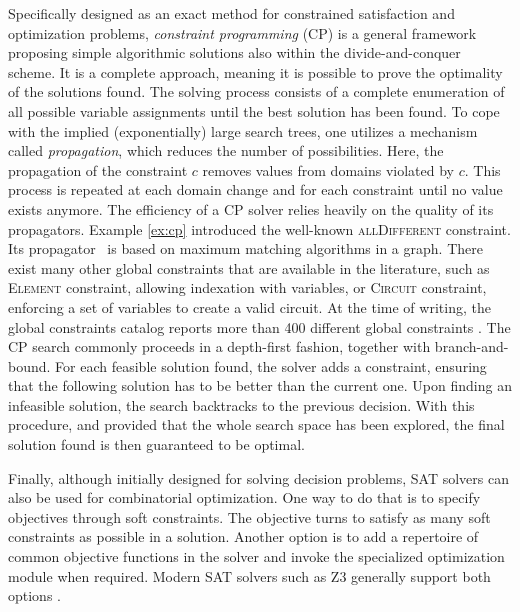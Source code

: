 \documentclass[twoside,11pt]{article}
\begin{document}
Specifically designed as an exact method for constrained satisfaction and optimization problems, \emph{constraint programming} (CP) \citep{rossi2006handbook} is a general framework proposing simple algorithmic solutions also within the divide-and-conquer scheme. It is a complete approach, meaning it is possible to {prove} the optimality of the solutions found. The solving process consists of a complete enumeration of all possible variable assignments until the best solution has been found. To cope with the implied (exponentially) large search trees, one utilizes a mechanism called \textit{propagation}, which reduces the number of possibilities. Here, the propagation of the constraint $c$ removes values from domains violated by $c$. This process is repeated at each domain change and for each constraint until no value exists anymore. The efficiency of a CP solver relies heavily on the quality of its propagators. 
Example \ref{ex:cp} introduced the well-known \textsc{allDifferent} constraint. Its propagator~\citep{regin1994filtering} is based on maximum matching algorithms in a graph.
There exist many other global constraints that are available in the literature, such as \textsc{Element} constraint, allowing indexation with variables,
or \textsc{Circuit} constraint, enforcing a set of variables to create a valid circuit. At the time of writing, the global constraints catalog reports more than 400 different global constraints \citep{beldiceanu2005global}.
The CP search commonly proceeds in a depth-first fashion, together with branch-and-bound. For each  feasible solution found, the solver adds a constraint, ensuring that the following solution has to be better than the current one. Upon finding an infeasible solution, the search backtracks to the previous decision. With this procedure, and provided that the whole search space has been explored, the final solution found is then guaranteed to be optimal. 

Finally, although initially designed for solving decision problems, SAT solvers can also be used for combinatorial optimization.
One way to do that is to specify objectives through soft constraints. 
The objective turns to satisfy as many soft constraints as possible in a solution. 
Another option is to add a repertoire of common objective functions in the solver and invoke
the specialized optimization module when required. Modern SAT solvers such as Z3 generally support both options \citep{moura2008z3}.
\end{document}
